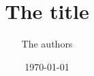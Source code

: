 \documentclass[a4paper,12pt]{article}
\begin{document}


\title{The title}

\author{The authors}

\date{\today}

\maketitle

\begin{abstract}
    \noindent
    \lipsum[1-2]
\end{abstract}



% 
% 

\appendix


\end{document}
